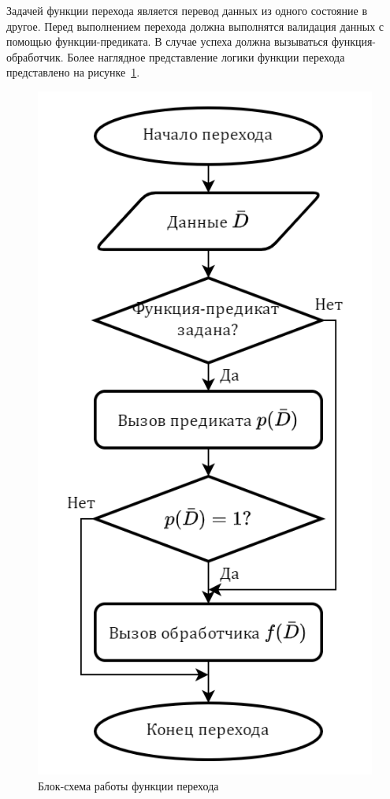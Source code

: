 Задачей функции перехода является перевод данных из одного состояние в другое. Перед выполнением перехода должна выполнятся валидация данных с помощью функции-предиката. В случае успеха должна вызываться функция-обработчик. Более наглядное представление логики функции перехода представлено на рисунке~\ref{fig:flowchartTransfer}.
\begin{figure}[!ht]
    \centering
    \includegraphics[height=0.4\textheight]{figures/flowchart.transfer.png}
    \caption{Блок-схема работы функции перехода}
    \label{fig:flowchartTransfer}
\end{figure}

